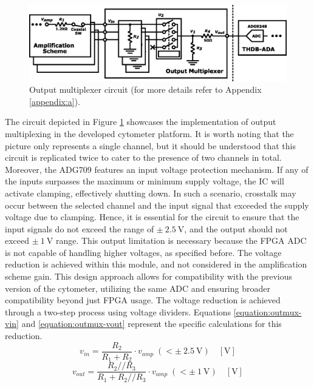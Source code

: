 \begin{figure}[!ht]
    \centering
    \includegraphics[width=.9\textwidth]{images/chapter_4/communications/outmux.eps}
    \caption{Output multiplexer circuit (for more details refer to Appendix \ref{appendix:a}).}
    \label{figure:outmux}
\end{figure}

The circuit depicted in Figure \ref{figure:outmux} showcases the implementation of output multiplexing in the developed cytometer platform. It is worth noting that the picture only represents a single channel, but it should be understood that this circuit is replicated twice to cater to the presence of two channels in total. Moreover, the $\mathrm{ADG709}$ features an input voltage protection mechanism. If any of the inputs surpasses the maximum or minimum supply voltage, the \ac{IC} will activate clamping, effectively shutting down. In such a scenario, crosstalk may occur between the selected channel and the input signal that exceeded the supply voltage due to clamping. Hence, it is essential for the circuit to ensure that the input signals do not exceed the range of  $\mathrm{\pm~2.5~V}$, and the output should not exceed $\mathrm{\pm~1~V}$ range. This output limitation is necessary because the \ac{FPGA} \ac{ADC} is not capable of handling higher voltages, as specified before. The voltage reduction is achieved within this module, and not considered in the amplification scheme gain. This design approach allows for compatibility with the previous version of the cytometer, utilizing the same \ac{ADC} and ensuring broader compatibility beyond just \ac{FPGA} usage. The voltage reduction is achieved through a two-step process using voltage dividers. Equations \ref{equation:outmux-vin} and \ref{equation:outmux-vout} represent the specific calculations for this reduction.
\begin{equation}
    v_{in} = \frac{R_{2}}{R_{1}+R_{2}} \cdot v_{amp}\; \left(< \pm~2.5~\mathrm{V}\right) \quad [\mathrm{V}]
    \label{equation:outmux-vin}
\end{equation}
\begin{equation}
    v_{out} = \frac{R_{2}//R_{3}}{R_{1}+R_{2}//R_{3}} \cdot v_{amp}\; \left(< \pm~ 1~\mathrm{V}\right) \quad [\mathrm{V}]
    \label{equation:outmux-vout}
\end{equation}

